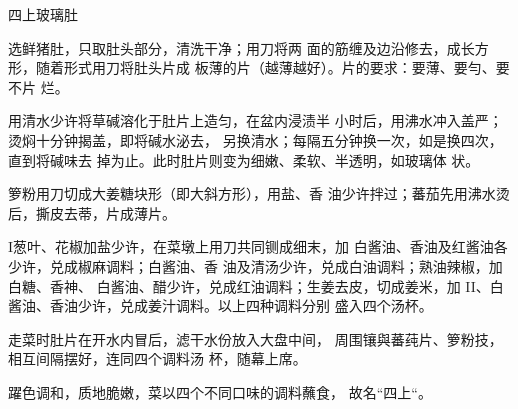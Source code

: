 \begin{recipe}{四上玻璃肚}

\ingredients


\cooking

\step 选鲜猪肚，只取肚头部分，清洗干净；用刀将两 面的筋缠及边沿修去，成长方形，随着形式用刀将肚头片成 板薄的片（越薄越好）。片的要求：要薄、要勻、要不片 烂。

\step 用清水少许将草碱溶化于肚片上造匀，在盆内浸渍半 小时后，用沸水冲入盖严；烫焖十分钟揭盖，即将碱水泌去， 另换清水；每隔五分钟换一次，如是换四次，直到将碱味去 掉为止。此时肚片则变为细嫩、柔软、半透明，如玻璃体 状。

箩粉用刀切成大姜糖块形（即大斜方形），用盐、香 油少许拌过；蕃茄先用沸水烫后，撕皮去蒂，片成薄片。

I葱叶、花椒加盐少许，在菜墩上用刀共同铡成细末，加 白酱油、香油及红酱油各少许，兑成椒麻调料；白酱油、香 油及清汤少许，兑成白油调料；熟油辣椒，加白糖、香神、 白酱油、醋少许，兑成红油调料；生姜去皮，切成姜米，加 II、白酱油、香油少许，兑成姜汁调料。以上四种调料分别 盛入四个汤杯。

\step 走菜时肚片在开水内冒后，滤干水份放入大盘中间， 周围镶與蕃莼片、箩粉技，相互间隔摆好，连同四个调料汤 杯，随幕上席。

\notes

躍色调和，质地脆嫩，菜以四个不同口味的调料蘸食， 故名“四上“。

\end{recipe}

